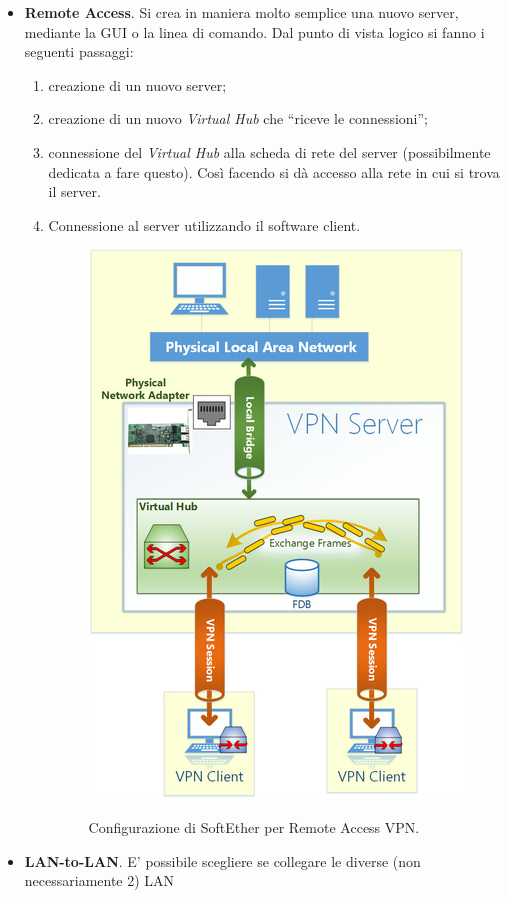 \begin{itemize}
  \item \textbf{Remote Access}. Si crea in maniera molto semplice una nuovo server, mediante la GUI o
  la linea di comando. Dal punto di vista logico si fanno i seguenti passaggi:
  \begin{enumerate}
    \item creazione di un nuovo server;
    \item creazione di un nuovo \textit{Virtual Hub} che ``riceve le connessioni'';
    \item connessione del \textit{Virtual Hub} alla scheda di rete del server (possibilmente dedicata a fare
    questo). Così facendo si dà accesso alla rete in cui si trova il server.
    \item Connessione al server utilizzando il software client.
    \begin{figure}
      \includegraphics[scale=0.4]{img/softether_ras}
      \label{fig:softether_ras}
      \caption[Configurazione di SoftEther per Remote Access VPN]{Configurazione di SoftEther per Remote Access VPN.}
    \end{figure}
  \end{enumerate}
  \item \textbf{LAN-to-LAN}. E' possibile scegliere se collegare le diverse (non necessariamente 2) LAN

\end{itemize}
